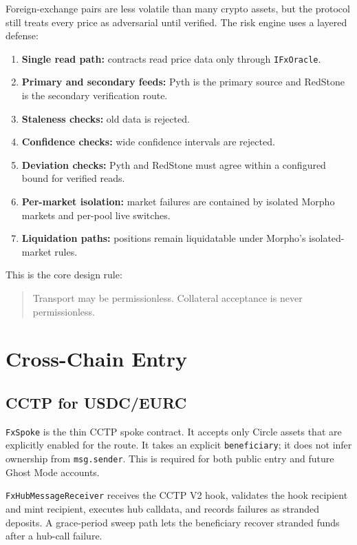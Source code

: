 \documentclass[11pt]{article}
\begin{document}
Foreign-exchange pairs are less volatile than many crypto assets, but the
protocol still treats every price as adversarial until verified. The risk
engine uses a layered defense:

\begin{enumerate}
  \item \textbf{Single read path:} contracts read price data only through
        \texttt{IFxOracle}.
  \item \textbf{Primary and secondary feeds:} Pyth is the primary source and
        RedStone is the secondary verification route.
  \item \textbf{Staleness checks:} old data is rejected.
  \item \textbf{Confidence checks:} wide confidence intervals are rejected.
  \item \textbf{Deviation checks:} Pyth and RedStone must agree within a
        configured bound for verified reads.
  \item \textbf{Per-market isolation:} market failures are contained by
        isolated Morpho markets and per-pool live switches.
  \item \textbf{Liquidation paths:} positions remain liquidatable under
        Morpho's isolated-market rules.
\end{enumerate}

This is the core design rule:

\begin{quote}
Transport may be permissionless. Collateral acceptance is never permissionless.
\end{quote}

\section{Cross-Chain Entry}

\subsection{CCTP for USDC/EURC}

\texttt{FxSpoke} is the thin CCTP spoke contract. It accepts only Circle assets
that are explicitly enabled for the route. It takes an explicit
\texttt{beneficiary}; it does not infer ownership from \texttt{msg.sender}.
This is required for both public entry and future Ghost Mode accounts.

\texttt{FxHubMessageReceiver} receives the CCTP V2 hook, validates the hook
recipient and mint recipient, executes hub calldata, and records failures as
stranded deposits. A grace-period sweep path lets the beneficiary recover
stranded funds after a hub-call failure.
\end{document}
